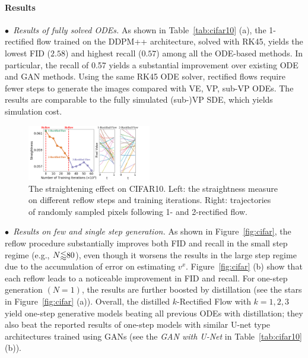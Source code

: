 \paragraph{Results} 
\emph{$\bullet$~Results of fully solved ODEs.} 
As shown in Table~\ref{tab:cifar10} (a), 
the 1-rectified flow 
trained on the DDPM++ architecture, solved with RK45, 
yields the lowest FID ($2.58$) and highest recall ($0.57$) among all the ODE-based methods.  
In particular, the recall of 0.57 yields a substantial improvement over existing ODE and GAN methods. 
Using the same RK45 ODE solver, rectified flows require fewer steps to generate the images compared with VE, VP, sub-VP ODEs. 
The results are comparable to the fully simulated (sub-)VP SDE, which yields simulation cost. 

\begin{figure}
    \vspace{-1\baselineskip}
    \includegraphics[width=0.48\textwidth]{arxiv_figures/fig_cifar_straightness.pdf}
    \caption{
    The straightening effect on CIFAR10. 
    Left: %
    the straightness measure on different reflow steps and training iterations. 
    Right: trajectories of randomly sampled pixels following 1- and 2-rectified flow. 
    }
    \vspace{-1\baselineskip}
    \label{fig:cifar_straight}
\end{figure}
\emph{$\bullet$~Results on few and single step generation.} 
As shown in Figure~\ref{fig:cifar}, 
the reflow procedure substantially improves both FID and recall in the small step regime (e.g., $N{\scriptsize\lessapprox}80$), even though it worsens the results 
in the large step regime due to the accumulation of error on estimating $v^x$. 
Figure~\ref{fig:cifar} (b) show that each reflow leads to a noticeable improvement in FID and recall.   
For one-step generation $(N=1)$, 
the results are further boosted by distillation (see the stars in Figure~\ref{fig:cifar} (a)).  
Overall, the distilled $k$-Rectified Flow  with $k=1,2,3$  
yield one-step generative models 
beating all previous ODEs with distillation; 
they also beat the reported results of one-step models with similar U-net type architectures 
trained using GANs (see the \emph{GAN with U-Net} in Table~\ref{tab:cifar10} (b)). 

